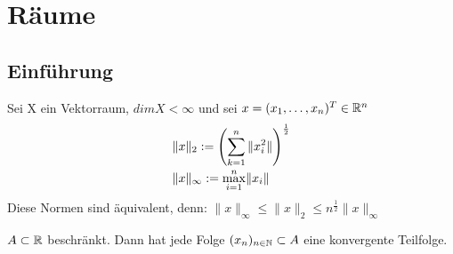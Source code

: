

\chapter{Räume}

\section{Einführung}

Sei X ein Vektorraum, $dim X < \infty $ und sei $x = (x_{1},\dotsc,x_{n})^{T} \in \mathbb{R}^{n}$
\begin{align*}
	& \|x\|_{2} := \left(\sum_{k = 1}^{n} \|x_{i}^{2}\| \right)^{\frac{1}{2}}\\
	& \|x\|_{\infty} := \smash{\displaystyle\max_{i = 1}^{n}}  \|x_{i}\|		
\end{align*}

Diese Normen sind äquivalent, denn:
$\| x \|_{\infty} \leq \| x \|_{2} \leq n^{\frac{1}{2}} \| x \|_{\infty}$ \newline

\begin{satz*} \label{s:1-heineborell} 
$A \subset \mathbb{R}$ beschränkt. Dann hat jede Folge $(x_{n})_{n \in \mathbb{N}} \subset A$ eine konvergente Teilfolge.
\end{satz*}


